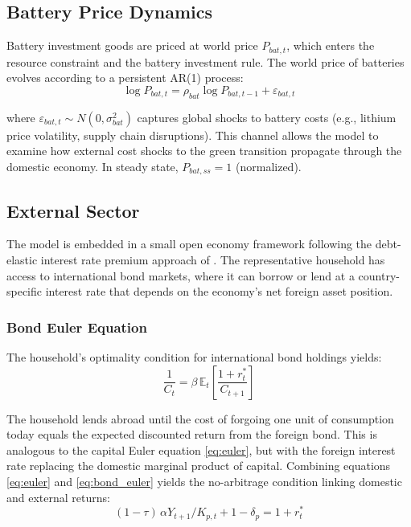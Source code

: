 \documentclass[12pt, a4paper]{article}
\begin{document}
\subsection{Battery Price Dynamics}

Battery investment goods are priced at world price $P_{bat,t}$, which enters the resource constraint and the battery investment rule. The world price of batteries evolves according to a persistent AR(1) process:
\begin{equation}
\log P_{bat,t} = \rho_{bat} \log P_{bat,t-1} + \varepsilon_{bat,t}
\label{eq:battery_price_shock}
\end{equation}

where $\varepsilon_{bat,t} \sim N(0, \sigma^2_{bat})$ captures global shocks to battery costs (e.g., lithium price volatility, supply chain disruptions). This channel allows the model to examine how external cost shocks to the green transition propagate through the domestic economy. In steady state, $P_{bat,ss} = 1$ (normalized).

\subsection{External Sector}

The model is embedded in a small open economy framework following the debt-elastic interest rate premium approach of \citet{schmittgrohe2003}. The representative household has access to international bond markets, where it can borrow or lend at a country-specific interest rate that depends on the economy's net foreign asset position.

\subsubsection{Bond Euler Equation}

The household's optimality condition for international bond holdings yields:
\begin{equation}
\frac{1}{C_t} = \beta \, \mathbb{E}_t \left[ \frac{1 + r^*_t}{C_{t+1}} \right]
\label{eq:bond_euler}
\end{equation}

The household lends abroad until the cost of forgoing one unit of consumption today equals the expected discounted return from the foreign bond. This is analogous to the capital Euler equation \eqref{eq:euler}, but with the foreign interest rate replacing the domestic marginal product of capital. Combining equations \eqref{eq:euler} and \eqref{eq:bond_euler} yields the no-arbitrage condition linking domestic and external returns:
\begin{equation}
(1-\tau)\,\alpha Y_{t+1}/K_{p,t} + 1 - \delta_p = 1 + r^*_t
\label{eq:no_arbitrage}
\end{equation}
\end{document}

